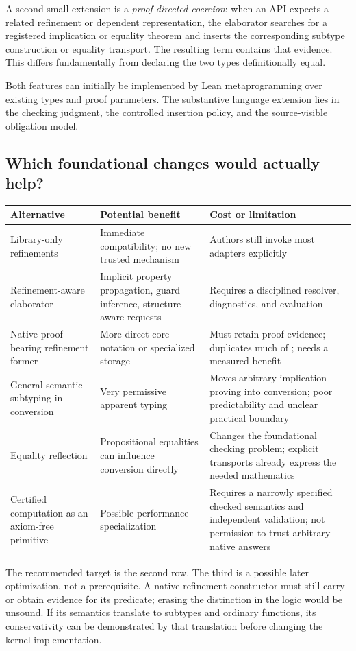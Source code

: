 \documentclass[11pt,a4paper]{article}
\newcommand{\code}[1]{\texttt{\detokenize{#1}}}
\theoremstyle{plain}
\theoremstyle{definition}
\begin{document}
A second small extension is a \emph{proof-directed coercion}: when an API expects a related refinement or dependent representation, the elaborator searches for a registered implication or equality theorem and inserts the corresponding subtype construction or equality transport. The resulting term contains that evidence. This differs fundamentally from declaring the two types definitionally equal.

Both features can initially be implemented by Lean metaprogramming over existing types and proof parameters. The substantive language extension lies in the checking judgment, the controlled insertion policy, and the source-visible obligation model.

\subsection{Which foundational changes would actually help?}
\begin{center}\small
\begin{tabularx}{\textwidth}{@{}L{33mm}Y Y@{}}
\toprule
Alternative & Potential benefit & Cost or limitation\\
\midrule
Library-only refinements & Immediate compatibility; no new trusted mechanism & Authors still invoke most adapters explicitly\\
Refinement-aware elaborator & Implicit property propagation, guard inference, structure-aware requests & Requires a disciplined resolver, diagnostics, and evaluation\\
Native proof-bearing refinement former & More direct core notation or specialized storage & Must retain proof evidence; duplicates much of \code{Subtype}; needs a measured benefit\\
General semantic subtyping in conversion & Very permissive apparent typing & Moves arbitrary implication proving into conversion; poor predictability and unclear practical boundary\\
Equality reflection & Propositional equalities can influence conversion directly & Changes the foundational checking problem; explicit transports already express the needed mathematics\\
Certified computation as an axiom-free primitive & Possible performance specialization & Requires a narrowly specified checked semantics and independent validation; not permission to trust arbitrary native answers\\
\bottomrule
\end{tabularx}
\end{center}
The recommended target is the second row. The third is a possible later optimization, not a prerequisite. A native refinement constructor must still carry or obtain evidence for its predicate; erasing the distinction in the logic would be unsound. If its semantics translate to subtypes and ordinary functions, its conservativity can be demonstrated by that translation before changing the kernel implementation.
\end{document}
